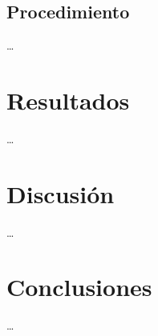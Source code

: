 \documentclass[runningheads,a4paper]{llncs}
\begin{document}
\subsection{Procedimiento}
\ldots

\section{Resultados}
\ldots

\section{Discusi\'on}
\ldots

\section{Conclusiones}
\ldots


\newpage
\end{document}
